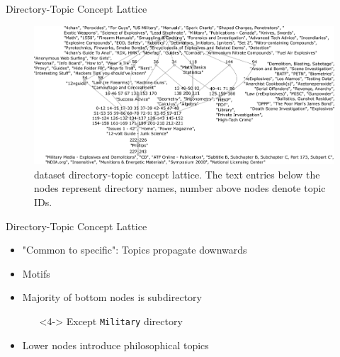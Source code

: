 \begin{frame}{Directory-Topic Concept Lattice}

    \begin{figure}[t]
        \centering
        \includegraphics[width=\textwidth]{images/fca_graph_across_dirs_02_03_25_altered3.png}
        \caption{\ac{dataset} directory-topic concept lattice.
            The text entries below the nodes represent directory names, number above nodes denote topic IDs.
        }
        \label{fig:fca_across_dirs}
    \end{figure}
    
\end{frame}

\begin{frame}{Directory-Topic Concept Lattice}

    \begin{itemize}
        \item "Common to specific": Topics propagate downwards 
        \item<2-> Motifs
        \item<3-> Majority of bottom nodes is subdirectory
        \begin{itemize}
            \item[\ding{43}]<4-> Except \texttt{Military} directory
        \end{itemize}
        \item<5-> Lower nodes introduce philosophical topics
    \end{itemize}

\end{frame}